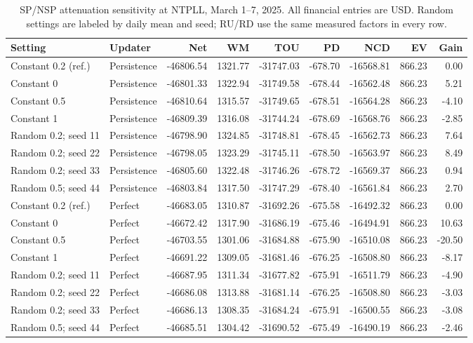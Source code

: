 \documentclass[final,5p,times]{elsarticle}
\begin{document}
\begin{table}[p]
\centering
\caption{SP/NSP attenuation sensitivity at NTPLL, March 1--7, 2025. All financial entries are USD. Random settings are labeled by daily mean and seed; RU/RD use the same measured factors in every row.}
\label{tab:weekly_factors}
\footnotesize
\setlength{\tabcolsep}{3pt}
\begin{tabular}{llrrrrrrr}
\toprule
Setting & Updater & Net & WM & TOU & PD & NCD & EV & Gain \\
\midrule
Constant 0.2 (ref.) & Persistence & -46806.54 & 1321.77 & -31747.03 & -678.70 & -16568.81 & 866.23 & 0.00 \\
Constant 0 & Persistence & -46801.33 & 1322.94 & -31749.58 & -678.44 & -16562.48 & 866.23 & 5.21 \\
Constant 0.5 & Persistence & -46810.64 & 1315.57 & -31749.65 & -678.51 & -16564.28 & 866.23 & -4.10 \\
Constant 1 & Persistence & -46809.39 & 1316.08 & -31744.24 & -678.69 & -16568.76 & 866.23 & -2.85 \\
Random 0.2; seed 11 & Persistence & -46798.90 & 1324.85 & -31748.81 & -678.45 & -16562.73 & 866.23 & 7.64 \\
Random 0.2; seed 22 & Persistence & -46798.05 & 1323.29 & -31745.11 & -678.50 & -16563.97 & 866.23 & 8.49 \\
Random 0.2; seed 33 & Persistence & -46805.60 & 1322.48 & -31746.26 & -678.72 & -16569.37 & 866.23 & 0.94 \\
Random 0.5; seed 44 & Persistence & -46803.84 & 1317.50 & -31747.29 & -678.40 & -16561.84 & 866.23 & 2.70 \\
\midrule
Constant 0.2 (ref.) & Perfect & -46683.05 & 1310.87 & -31692.26 & -675.58 & -16492.32 & 866.23 & 0.00 \\
Constant 0 & Perfect & -46672.42 & 1317.90 & -31686.19 & -675.46 & -16494.91 & 866.23 & 10.63 \\
Constant 0.5 & Perfect & -46703.55 & 1301.06 & -31684.88 & -675.90 & -16510.08 & 866.23 & -20.50 \\
Constant 1 & Perfect & -46691.22 & 1309.05 & -31681.46 & -676.25 & -16508.80 & 866.23 & -8.17 \\
Random 0.2; seed 11 & Perfect & -46687.95 & 1311.34 & -31677.82 & -675.91 & -16511.79 & 866.23 & -4.90 \\
Random 0.2; seed 22 & Perfect & -46686.08 & 1313.88 & -31681.14 & -676.25 & -16508.80 & 866.23 & -3.03 \\
Random 0.2; seed 33 & Perfect & -46686.13 & 1308.35 & -31684.24 & -675.91 & -16500.55 & 866.23 & -3.08 \\
Random 0.5; seed 44 & Perfect & -46685.51 & 1304.42 & -31690.52 & -675.49 & -16490.19 & 866.23 & -2.46 \\
\bottomrule
\end{tabular}
\end{table}
\end{document}
